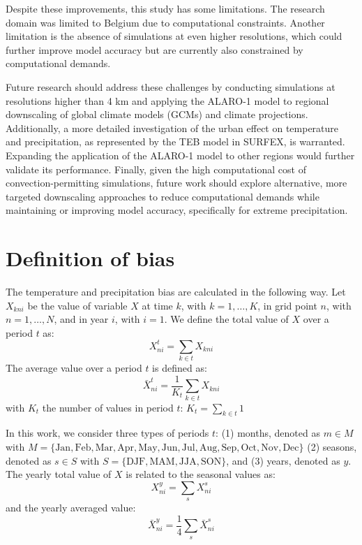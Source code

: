 \documentclass[journal abbreviation, manuscript]{copernicus}
\begin{document}
Despite these improvements, this study has some limitations. 
The research domain was limited to Belgium due to computational constraints.
Another limitation is the absence of simulations at even higher resolutions, which could further improve model accuracy but are currently also constrained by computational demands.

Future research should address these challenges by conducting simulations at resolutions higher than 4 km and applying the ALARO-1 model to regional downscaling of global climate models (GCMs) and climate projections.
Additionally, a more detailed investigation of the urban effect on temperature and precipitation, as represented by the TEB model in SURFEX, is warranted.
Expanding the application of the ALARO-1 model to other regions would further validate its performance.
Finally, given the high computational cost of convection-permitting simulations, future work should explore alternative, more targeted downscaling approaches to reduce computational demands while maintaining or improving model accuracy, specifically for extreme precipitation.

\appendix

\section{Definition of bias}
\label{sect:bias_definition}

The temperature and precipitation bias are calculated in the following way. Let $X_{kni}$ be the value of variable $X$ at time $k$, with $k = 1, \ldots, K$, in grid point $n$, with $n = 1, \ldots, N$, and in year $i$, with $i = 1$. We define the total value of $X$ over a period $t$ as:
\begin{equation*}
    X^t_{ni} = \sum_{k \in t} X_{kni}
\end{equation*}
The average value over a period $t$ is defined as:
\begin{equation*}
    \bar{X}^t_{ni} = \frac{1}{K_t} \sum_{k \in t} X_{kni}
\end{equation*}
with $K_t$ the number of values in period $t$: $K_t = \sum_{k \in t} 1$

In this work, we consider three types of periods $t$: (1) months, denoted as $m \in M$ with $M = \{\text{Jan}, \text{Feb}, \text{Mar}, \text{Apr}, \text{May}, \text{Jun}, \text{Jul}, \text{Aug}, \text{Sep}, \text{Oct}, \text{Nov}, \text{Dec} \}$ (2) seasons, denoted as $s \in S$ with $S = \{\text{DJF}, \text{MAM}, \text{JJA}, \text{SON} \}$, and (3) years, denoted as $y$. The yearly total value of $X$ is related to the seasonal values as:
\begin{equation*}
    X^y_{ni} = \sum_{s} X^s_{ni}
\end{equation*}
and the yearly averaged value:
\begin{equation*}
    \bar{X}^y_{ni} = \frac{1}{4} \sum_{s} \bar{X}^s_{ni}
\end{equation*}
\end{document}

